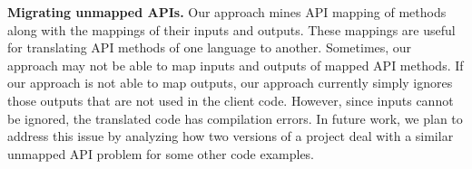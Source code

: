 \textbf{Migrating unmapped APIs.} Our approach mines API mapping of
methods along with the mappings of their inputs and outputs. These
mappings are useful for translating API methods of one language to
another. Sometimes, our approach may not be able to map inputs and
outputs of mapped API methods. If our approach is not able to map
outputs, our approach currently simply ignores those outputs that are not used
in the client code. However, since inputs cannot be ignored, the
translated code has compilation errors. In future work, we
plan to address this issue by analyzing how two versions of a
project deal with a similar unmapped API problem for some other code
examples.
